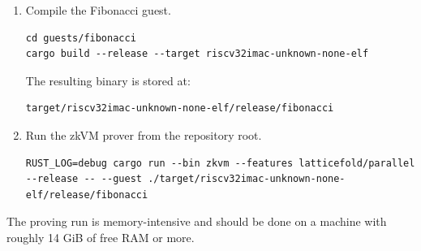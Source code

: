\begin{enumerate}
	\item Compile the Fibonacci guest.

	      \begin{verbatim}
cd guests/fibonacci
cargo build --release --target riscv32imac-unknown-none-elf
\end{verbatim}

	      The resulting binary is stored at:

	      \begin{verbatim}
target/riscv32imac-unknown-none-elf/release/fibonacci
\end{verbatim}

	\item Run the zkVM prover from the repository root.

	      \begin{verbatim}
RUST_LOG=debug cargo run --bin zkvm --features latticefold/parallel --release -- --guest ./target/riscv32imac-unknown-none-elf/release/fibonacci
\end{verbatim}
\end{enumerate}

The proving run is memory-intensive and should be done on a machine with roughly
14 GiB of free RAM or more.
